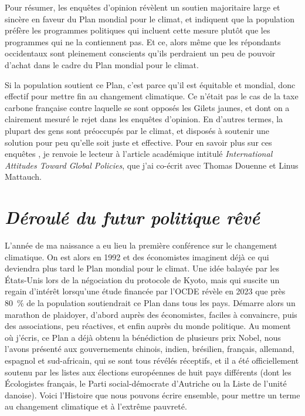 \documentclass[a5paper,french,openany]{memoir}
\begin{document}
Pour résumer, les enquêtes d'opinion révèlent un soutien majoritaire large et sincère en faveur du Plan mondial pour le climat, et indiquent que la population préfère les programmes politiques qui incluent cette mesure plutôt que les programmes qui ne la contiennent pas. Et ce, alors même que les répondants occidentaux sont pleinement conscients qu'ils perdraient un peu de pouvoir d'achat dans le cadre du Plan mondial pour le climat. 

Si la population soutient ce Plan, c'est parce qu'il est équitable et mondial, donc effectif pour mettre fin au changement climatique. Ce n'était pas le cas de la taxe carbone française contre laquelle se sont opposés les Gilets jaunes, et dont on a clairement mesuré le rejet dans les enquêtes d'opinion. En d'autres termes, la plupart des gens sont préoccupés par le climat, et disposés à soutenir une solution pour peu qu'elle soit juste et effective. 
Pour en savoir plus sur ces enquêtes%
, je renvoie le lecteur à l'article académique intitulé \textit{International Attitudes Toward Global Policies}, que j'ai co-écrit avec Thomas Douenne et Linus Mattauch. 

\chapter*{\textit{Déroulé du futur politique rêvé}}\label{ch:narr_reve}

L'année de ma naissance a eu lieu la première conférence sur le changement climatique. On est alors en 1992 et des économistes imaginent déjà ce qui deviendra plus tard le Plan mondial pour le climat. Une idée balayée par les États-Unis lors de la négociation du protocole de Kyoto, mais qui suscite un regain d'intérêt lorsqu'une étude financée par l'OCDE révèle en 2023 que près 80~\% de la population soutiendrait ce Plan dans tous les pays. Démarre alors un marathon de plaidoyer, d'abord auprès des économistes, faciles à convaincre, puis des associations, peu réactives, 
et enfin auprès du monde politique. Au moment où j'écris, ce Plan a déjà obtenu la bénédiction de plusieurs prix Nobel, nous l'avons présenté aux gouvernements chinois, indien, brésilien, français, allemand, espagnol et sud-africain, qui se sont tous révélés réceptifs, %
et il a été officiellement soutenu par les listes aux élections européennes de huit pays différents (dont les Écologistes français, le Parti social-démocrate d'Autriche ou la Liste de l'unité danoise). 
Voici l'Histoire que nous pouvons écrire ensemble, pour mettre un terme au changement climatique et à l'extrême pauvreté. 
\end{document}
